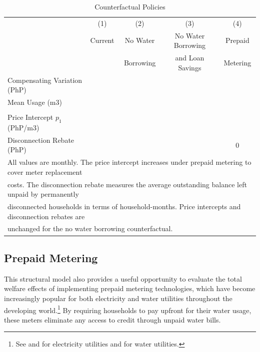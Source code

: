 \documentclass[12pt]{article}
\begin{document}
\begin{table}[H]
\centering
\caption{Counterfactual Policies}\label{table:counter}
\begin{tabular}{l*{1}{cccc}}
\toprule
 & (1) & (2) & (3) & (4) \\
 & Current & No Water   & No Water Borrowing & Prepaid  \\
 &         & Borrowing  & and Loan Savings      & Metering  \\
\midrule   
Compensating Variation (PhP) & &  &   &  \\
Mean Usage (m3) &  &   &  &  \\
 &         &           &         &  \\
Price Intercept $p_1$ (PhP/m3) &  & &   &  \\
Disconnection Rebate (PhP) &  & & & 0 \\
%
%
\bottomrule
\multicolumn{5}{l}{ \scriptsize  All values are monthly. The price intercept increases under prepaid metering to cover meter replacement } \\[-.5em]
\multicolumn{5}{l}{ \scriptsize  costs.  The disconnection rebate measures the average outstanding balance left unpaid by permanently } \\[-.5em]
\multicolumn{5}{l}{ \scriptsize  disconnected households in terms of household-months.  Price intercepts and disconnection rebates are } \\[-.5em]
\multicolumn{5}{l}{ \scriptsize  unchanged for the no water borrowing counterfactual.}
\end{tabular}
\end{table}


\subsection{Prepaid Metering}

This structural model also provides a useful opportunity to evaluate the total welfare effects of implementing prepaid metering technologies, which have become increasingly popular for both electricity and water utilities throughout the developing world.\footnote{See \cite{jack2016charging} and \cite{northeast2014} for electricity utilities and \cite{heymans2014limits} for water utilities.}  By requiring households to pay upfront for their water usage, these meters eliminate any access to credit through unpaid water bills.  
\end{document}
